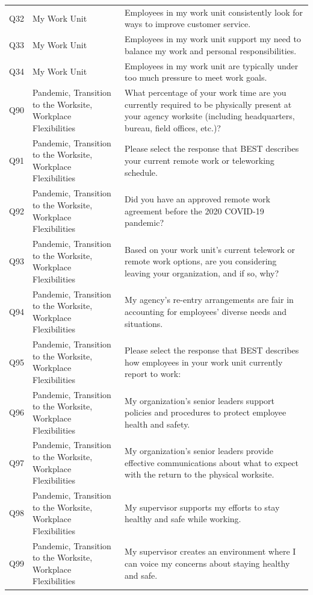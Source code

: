\documentclass[
  man]{apa7}
\newenvironment{lltable}{\begin{landscape}\centering\begin{ThreePartTable}}{\end{ThreePartTable}\end{landscape}}
\begin{document}
\begin{lltable}
{\begin{longtable}{lll}
Q32 & My Work Unit & Employees in my work unit consistently look for ways to improve customer service.\\
Q33 & My Work Unit & Employees in my work unit support my need to balance my work and personal responsibilities.\\
Q34 & My Work Unit & Employees in my work unit are typically under too much pressure to meet work goals.\\
Q90 & Pandemic, Transition to the Worksite, Workplace Flexibilities & What percentage of your work time are you currently required to be physically present at your agency worksite (including headquarters, bureau, field offices, etc.)?\\
Q91 & Pandemic, Transition to the Worksite, Workplace Flexibilities & Please select the response that BEST describes your current remote work or teleworking schedule.\\
Q92 & Pandemic, Transition to the Worksite, Workplace Flexibilities & Did you have an approved remote work agreement before the 2020 COVID-19 pandemic?\\
Q93 & Pandemic, Transition to the Worksite, Workplace Flexibilities & Based on your work unit’s current telework or remote work options, are you considering leaving your organization, and if so, why?\\
Q94 & Pandemic, Transition to the Worksite, Workplace Flexibilities & My agency’s re-entry arrangements are fair in accounting for employees’ diverse needs and situations.\\
Q95 & Pandemic, Transition to the Worksite, Workplace Flexibilities & Please select the response that BEST describes how employees in your work unit currently report to work:\\
Q96 & Pandemic, Transition to the Worksite, Workplace Flexibilities & My organization’s senior leaders support policies and procedures to protect employee health and safety.\\
Q97 & Pandemic, Transition to the Worksite, Workplace Flexibilities & My organization’s senior leaders provide effective communications about what to expect with the return to the physical worksite.\\
Q98 & Pandemic, Transition to the Worksite, Workplace Flexibilities & My supervisor supports my efforts to stay healthy and safe while working.\\
Q99 & Pandemic, Transition to the Worksite, Workplace Flexibilities & My supervisor creates an environment where I can voice my concerns about staying healthy and safe.\\
\bottomrule
\end{longtable}

}

\end{lltable}
\end{document}
